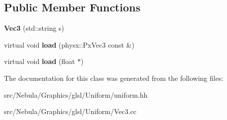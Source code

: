 \subsection*{\-Public \-Member \-Functions}
\begin{DoxyCompactItemize}
\item 
\hypertarget{classNeb_1_1glsl_1_1Uniform_1_1Scalar_1_1Vec3_a00e17308113063b4413ea425ddf975ad}{{\bfseries \-Vec3} (std\-::string s)}\label{classNeb_1_1glsl_1_1Uniform_1_1Scalar_1_1Vec3_a00e17308113063b4413ea425ddf975ad}

\item 
\hypertarget{classNeb_1_1glsl_1_1Uniform_1_1Scalar_1_1Vec3_a5713aa74fb8e57849ce10f0f9ecf51b2}{virtual void {\bfseries load} (physx\-::\-Px\-Vec3 const \&)}\label{classNeb_1_1glsl_1_1Uniform_1_1Scalar_1_1Vec3_a5713aa74fb8e57849ce10f0f9ecf51b2}

\item 
\hypertarget{classNeb_1_1glsl_1_1Uniform_1_1Scalar_1_1Vec3_a2355fadc4a3d7be8cde7e4dc1f5c9475}{virtual void {\bfseries load} (float $\ast$)}\label{classNeb_1_1glsl_1_1Uniform_1_1Scalar_1_1Vec3_a2355fadc4a3d7be8cde7e4dc1f5c9475}

\end{DoxyCompactItemize}


\-The documentation for this class was generated from the following files\-:\begin{DoxyCompactItemize}
\item 
src/\-Nebula/\-Graphics/glsl/\-Uniform/uniform.\-hh\item 
src/\-Nebula/\-Graphics/glsl/\-Uniform/\-Vec3.\-cc\end{DoxyCompactItemize}
